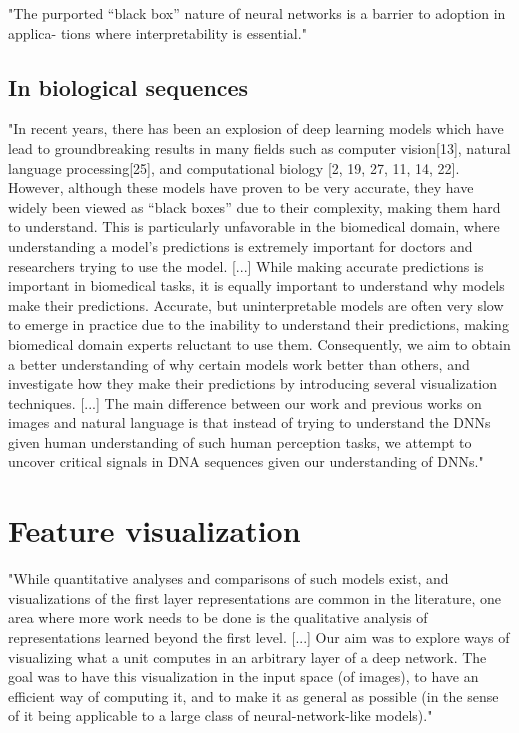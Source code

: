 \documentclass[]{scrartcl}
\begin{document}
"The purported “black box” nature of neural networks is a barrier to adoption in applica- tions where interpretability is essential." \cite{Shrikumar2017}

\subsection{In biological sequences}
"In recent years, there has been an explosion of deep learning models which have lead to groundbreaking results in many fields such as computer vision[13], natural language processing[25], and computational biology [2, 19, 27, 11, 14, 22]. However, although these models have proven to be very accurate, they have widely been viewed as “black boxes” due to their complexity, making them hard to understand. This is particularly unfavorable in the biomedical domain, where understanding a model’s predictions is extremely important for doctors and researchers trying to use the model.
[...]
While making accurate predictions is important in biomedical tasks, it is equally important to understand why models make their predictions. Accurate, but uninterpretable models are often very slow to emerge in practice due to the inability to understand their predictions, making biomedical domain experts reluctant to use them. Consequently, we aim to obtain a better understanding of why certain models work better than others, and investigate how they make their predictions by introducing several visualization techniques.
[...]
The main difference between our work and previous works on images and natural language is that instead of trying to understand the DNNs given human understanding of such human perception tasks, we attempt to uncover critical signals in DNA sequences given our understanding of DNNs." \cite{Lanchantin2016}

\section{Feature visualization}

"While quantitative analyses and comparisons of such models exist, and visualizations of the first layer representations are common in the literature, one area where more work needs to be done is the qualitative analysis of representations learned beyond the first level. [...] Our aim was to explore ways of visualizing what a unit computes in an arbitrary layer of a deep network. The goal was to have this visualization in the input space (of images), to have an efficient way of computing it, and to make it as general as possible (in the sense of it being applicable to a large class of neural-network-like models)." \cite{Erhan2009}
\end{document}
